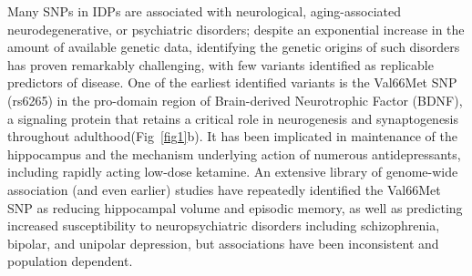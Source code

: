 \documentclass[10pt,letterpaper]{article}
\begin{document}
Many SNPs in IDPs are associated with neurological, aging-associated neurodegenerative, or psychiatric disorders; despite an exponential increase in the amount of available genetic data, identifying the genetic origins of such disorders has proven remarkably challenging, with few variants identified as replicable predictors of disease.  %
One of the earliest identified variants is the Val66Met SNP (rs6265)  in the pro-domain region of Brain-derived Neurotrophic Factor (BDNF), \cite{Notaras2015} a signaling protein %
that retains a critical role in neurogenesis and synaptogenesis throughout adulthood(Fig~\ref{fig1}b).\cite{Korte1995} It has been implicated in maintenance of the hippocampus and the mechanism underlying action of numerous antidepressants, \cite{Autry2012,Bjoerkholm2016} %
including rapidly acting low-dose ketamine.\cite{Autry2011}  An extensive library of genome-wide association (and even earlier) studies have repeatedly identified the Val66Met SNP as reducing hippocampal volume and episodic memory, as well as predicting increased susceptibility to neuropsychiatric disorders including schizophrenia, bipolar, and unipolar depression, but associations have been inconsistent and population dependent. \cite{soliman2010,Chen2008,Verhagen2010,Notaras2015, Autry2011} 
\end{document}
